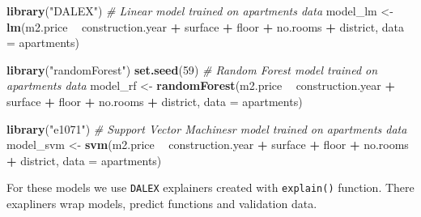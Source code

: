 \documentclass[]{krantz}
\newenvironment{Shaded}{\begin{snugshade}}{\end{snugshade}}
\newcommand{\CommentTok}[1]{\textcolor[rgb]{0.56,0.35,0.01}{\textit{#1}}}
\newcommand{\DataTypeTok}[1]{\textcolor[rgb]{0.13,0.29,0.53}{#1}}
\newcommand{\DecValTok}[1]{\textcolor[rgb]{0.00,0.00,0.81}{#1}}
\newcommand{\KeywordTok}[1]{\textcolor[rgb]{0.13,0.29,0.53}{\textbf{#1}}}
\newcommand{\NormalTok}[1]{#1}
\newcommand{\OperatorTok}[1]{\textcolor[rgb]{0.81,0.36,0.00}{\textbf{#1}}}
\newcommand{\StringTok}[1]{\textcolor[rgb]{0.31,0.60,0.02}{#1}}
\theoremstyle{definition}
\theoremstyle{definition}
\theoremstyle{definition}
\theoremstyle{remark}
\begin{document}
\begin{Shaded}
\begin{Highlighting}[]
\KeywordTok{library}\NormalTok{(}\StringTok{"DALEX"}\NormalTok{)}
\CommentTok{# Linear model trained on apartments data}
\NormalTok{model_lm <-}\StringTok{ }\KeywordTok{lm}\NormalTok{(m2.price }\OperatorTok{~}\StringTok{ }\NormalTok{construction.year }\OperatorTok{+}\StringTok{ }\NormalTok{surface }\OperatorTok{+}\StringTok{ }\NormalTok{floor }\OperatorTok{+}\StringTok{ }
\StringTok{                      }\NormalTok{no.rooms }\OperatorTok{+}\StringTok{ }\NormalTok{district, }\DataTypeTok{data =}\NormalTok{ apartments)}

\KeywordTok{library}\NormalTok{(}\StringTok{"randomForest"}\NormalTok{)}
\KeywordTok{set.seed}\NormalTok{(}\DecValTok{59}\NormalTok{)}
\CommentTok{# Random Forest model trained on apartments data}
\NormalTok{model_rf <-}\StringTok{ }\KeywordTok{randomForest}\NormalTok{(m2.price }\OperatorTok{~}\StringTok{ }\NormalTok{construction.year }\OperatorTok{+}\StringTok{ }\NormalTok{surface }\OperatorTok{+}\StringTok{ }\NormalTok{floor }\OperatorTok{+}\StringTok{ }
\StringTok{                      }\NormalTok{no.rooms }\OperatorTok{+}\StringTok{ }\NormalTok{district, }\DataTypeTok{data =}\NormalTok{ apartments)}

\KeywordTok{library}\NormalTok{(}\StringTok{"e1071"}\NormalTok{)}
\CommentTok{# Support Vector Machinesr model trained on apartments data}
\NormalTok{model_svm <-}\StringTok{ }\KeywordTok{svm}\NormalTok{(m2.price }\OperatorTok{~}\StringTok{ }\NormalTok{construction.year }\OperatorTok{+}\StringTok{ }\NormalTok{surface }\OperatorTok{+}\StringTok{ }\NormalTok{floor }\OperatorTok{+}\StringTok{ }
\StringTok{                         }\NormalTok{no.rooms }\OperatorTok{+}\StringTok{ }\NormalTok{district, }\DataTypeTok{data =}\NormalTok{ apartments)}
\end{Highlighting}
\end{Shaded}

For these models we use \texttt{DALEX} explainers created with
\texttt{explain()} function. There exapliners wrap models, predict
functions and validation data.

\begin{Shaded}
\end{Shaded}
\end{document}
